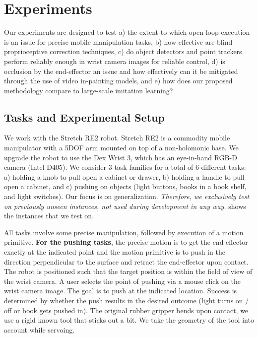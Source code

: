


\section{Experiments}
Our experiments are designed to test a) the extent to which open loop execution is an issue for precise mobile manipulation tasks, b) how effective are blind proprioceptive correction techniques, c) do object detectors and point trackers perform reliably enough in wrist camera images for reliable control, d) is occlusion by the end-effector an issue and how effectively can it be mitigated through the use of video in-painting models, and e) how does our proposed \name methodology compare to large-scale imitation learning? 


\subsection{Tasks and Experimental Setup}
We work with the Stretch RE2 robot. Stretch RE2 is a commodity mobile manipulator with a 5DOF arm mounted on top of a non-holomonic base. We upgrade the robot to use the Dex Wrist 3, which has an eye-in-hand RGB-D camera (Intel D405). 
We consider 3 task families for a total
of 6 different tasks: a) holding a knob to pull open a cabinet or drawer, b) holding a
handle to pull open a cabinet, and c) pushing on objects (light buttons, books
in a book shelf, and light switches). Our focus is on generalization. {\it
Therefore, we exclusively test on previously unseen instances, not used during
development in any way.} 
 shows the instances that we test on. 

All tasks involve some precise manipulation, followed by execution of a motion
primitive. {\bf For the pushing tasks}, the precise motion is to get the
end-effector exactly at the indicated point and the motion primitive is to push
in the direction perpendicular to the surface and retract the end-effector 
upon contact. The robot is positioned such
that the target position is within the field of view of the wrist camera. A user
selects the point of pushing via a mouse click on the wrist camera image. The
goal is to push at the indicated location. Success is determined by whether the
push results in the desired outcome (light turns on / off or book gets pushed in). 
The original rubber gripper bends upon contact, we use a rigid known tool
that sticks out a bit. We take the geometry of the tool into account while servoing.


